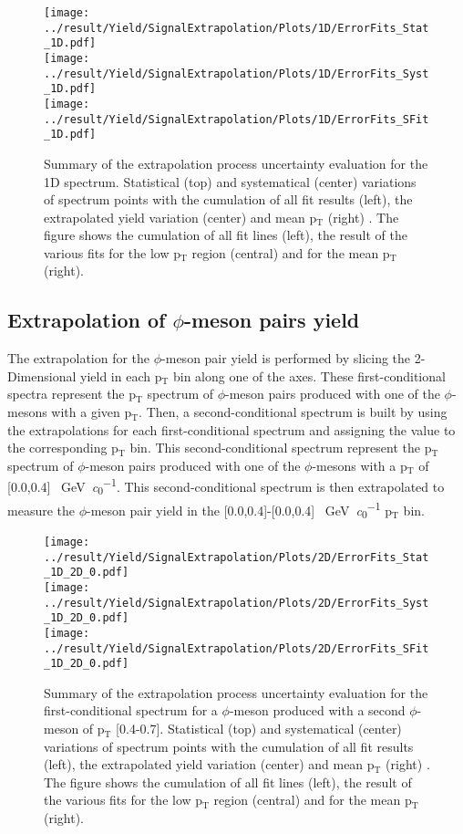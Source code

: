 \begin{figure}[!h]
\centering
\texttt{[image: ../result/Yield/SignalExtrapolation/Plots/1D/ErrorFits\_Stat\_1D.pdf]}\\
\texttt{[image: ../result/Yield/SignalExtrapolation/Plots/1D/ErrorFits\_Syst\_1D.pdf]}\\
\texttt{[image: ../result/Yield/SignalExtrapolation/Plots/1D/ErrorFits\_SFit\_1D.pdf]}
\caption{Summary of the extrapolation process uncertainty evaluation for the 1D spectrum. Statistical (top) and systematical (center) variations of spectrum points with the cumulation of all fit results (left), the extrapolated yield variation (center) and mean p$_{\text{T}}$ (right) . The figure shows the cumulation of all fit lines (left), the result of the various fits for the low p$_{\text{T}}$ region (central) and for the mean p$_{\text{T}}$ (right).}
\label{fig:Extrap1D}
\end{figure}

\subsection{Extrapolation of $\phi$-meson pairs yield}
The extrapolation for the $\phi$-meson pair yield is performed by slicing the 2-Dimensional yield in each p$_{\text{T}}$ bin along one of the axes. These first-conditional spectra represent the p$_{\text{T}}$ spectrum of $\phi$-meson pairs produced with one of the $\phi$-mesons with a given p$_{\text{T}}$. Then, a second-conditional spectrum is built by using the extrapolations for each first-conditional spectrum and assigning the value to the corresponding p$_{\text{T}}$ bin. This second-conditional spectrum represent the p$_{\text{T}}$ spectrum of $\phi$-meson pairs produced with one of the $\phi$-mesons with a p$_{\text{T}}$ of [0.0,0.4] \SI{}{\giga\electronvolt\per\clight}. This second-conditional spectrum is then extrapolated to measure the $\phi$-meson pair yield in the [0.0,0.4]-[0.0,0.4] \SI{}{\giga\electronvolt\per\clight} p$_{\text{T}}$ bin.\\

\begin{figure}
\centering
\texttt{[image: ../result/Yield/SignalExtrapolation/Plots/2D/ErrorFits\_Stat\_1D\_2D\_0.pdf]}\\
\texttt{[image: ../result/Yield/SignalExtrapolation/Plots/2D/ErrorFits\_Syst\_1D\_2D\_0.pdf]}\\
\texttt{[image: ../result/Yield/SignalExtrapolation/Plots/2D/ErrorFits\_SFit\_1D\_2D\_0.pdf]}
\label{fig:Extrap2D_0}
\caption{Summary of the extrapolation process uncertainty evaluation for the first-conditional spectrum for a $\phi$-meson produced with a second $\phi$-meson of p$_{\text{T}}$ [0.4-0.7]. Statistical (top) and systematical (center) variations of spectrum points with the cumulation of all fit results (left), the extrapolated yield variation (center) and mean p$_{\text{T}}$ (right) . The figure shows the cumulation of all fit lines (left), the result of the various fits for the low p$_{\text{T}}$ region (central) and for the mean p$_{\text{T}}$ (right).}
\end{figure}

